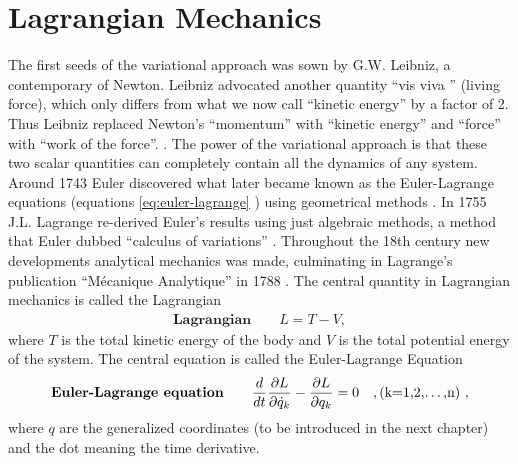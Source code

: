 \section{Lagrangian Mechanics}
The first seeds of the variational approach was sown by G.W. Leibniz, a contemporary of Newton. Leibniz advocated another quantity ``vis viva '' (living force), which only differs from what we now call ``kinetic energy'' by a factor of 2. Thus Leibniz replaced Newton's ``momentum'' with ``kinetic energy'' and ``force'' with ``work of the force''. \cite[p. xxi]{Lanczos1970}. The power of the variational approach is that these two scalar quantities can completely contain all the dynamics of any system. Around 1743 Euler discovered what later became known as the Euler-Lagrange equations (equations \eqref{eq:euler-lagrange} \cite[p. 61]{Lanczos1970}) using geometrical methods \cite[p. 67]{Goldstine1980} \cite{stack-euler-lagrange}. In 1755 J.L. Lagrange re-derived Euler's results using just algebraic methods, a method that Euler dubbed ``calculus of variations'' \cite[p. xiv]{Goldstine1980} \cite{stack-euler-lagrange}. Throughout the 18th century new developments analytical mechanics was made, culminating in Lagrange's publication ``Mécanique Analytique'' in 1788 \cite[p. 197]{Fraser1983}. The central quantity in Lagrangian mechanics is called the Lagrangian \cite[p. 3]{Hjorth2015}
\begin{align}
\label{eq:lagrangian}
\textbf{Lagrangian} \qquad L = T - V,
\end{align}
where $T$ is the total kinetic energy of the body and $V$ is the total potential energy of the system. The central equation is called the Euler-Lagrange Equation \cite{Hjorth2015}
\begin{align}
\label{eq:euler-lagrange}
\textbf{Euler-Lagrange equation} \qquad \dfrac{d}{dt} \dfrac{\partial L}{\partial \dot{q}_k} - \dfrac{\partial L}{\partial q_k} = 0 \quad ,\text{(k=1,2,\dots,n)}\ ,
\end{align}
where $q$ are the generalized coordinates (to be introduced in the next chapter) and the dot meaning the time derivative.


